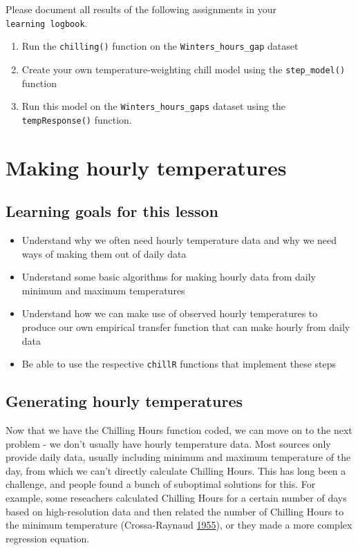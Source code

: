 \documentclass[
]{book}
\providecommand{\tightlist}{%
  \setlength{\itemsep}{0pt}\setlength{\parskip}{0pt}}
\begin{document}
Please document all results of the following assignments in your \texttt{learning\ logbook}.

\begin{enumerate}
\def\labelenumi{\arabic{enumi})}
\tightlist
\item
  Run the \texttt{chilling()} function on the \texttt{Winters\_hours\_gap} dataset
\item
  Create your own temperature-weighting chill model using the \texttt{step\_model()} function
\item
  Run this model on the \texttt{Winters\_hours\_gaps} dataset using the \texttt{tempResponse()} function.
\end{enumerate}

\hypertarget{making-hourly-temperatures}{%
\chapter{Making hourly temperatures}\label{making-hourly-temperatures}}

\hypertarget{goals_hourly}{%
\section*{Learning goals for this lesson}\label{goals_hourly}}

\begin{itemize}
\tightlist
\item
  Understand why we often need hourly temperature data and why we need ways of making them out of daily data
\item
  Understand some basic algorithms for making hourly data from daily minimum and maximum temperatures
\item
  Understand how we can make use of observed hourly temperatures to produce our own empirical transfer function that can make hourly from daily data
\item
  Be able to use the respective \texttt{chillR} functions that implement these steps
\end{itemize}

\hypertarget{generating-hourly-temperatures}{%
\section{Generating hourly temperatures}\label{generating-hourly-temperatures}}

Now that we have the Chilling Hours function coded, we can move on to the next problem - we don't usually have hourly temperature data. Most sources only provide daily data, usually including minimum and maximum temperature of the day, from which we can't directly calculate Chilling Hours. This has long been a challenge, and people found a bunch of suboptimal solutions for this. For example, some reseachers calculated Chilling Hours for a certain number of days based on high-resolution data and then related the number of Chilling Hours to the minimum temperature (Crossa-Raynaud \protect\hyperlink{ref-crossa1955effets}{1955}), or they made a more complex regression equation.
\end{document}
